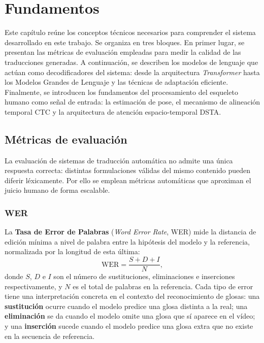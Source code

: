 \chapter{Fundamentos}\label{ch:fundamentos}
Este capítulo reúne los conceptos técnicos necesarios para comprender el sistema desarrollado en este trabajo.
Se organiza en tres bloques.
En primer lugar, se presentan las métricas de evaluación empleadas para medir la calidad de las traducciones generadas.
A continuación, se describen los modelos de lenguaje que actúan como decodificadores del sistema: desde la arquitectura \textit{Transformer} hasta los Modelos Grandes de Lenguaje y las técnicas de adaptación eficiente.
Finalmente, se introducen los fundamentos del procesamiento del esqueleto humano como señal de entrada: la estimación de pose, el mecanismo de alineación temporal CTC y la arquitectura de atención espacio-temporal DSTA.


\section{Métricas de evaluación}
La evaluación de sistemas de traducción automática no admite una única respuesta correcta: distintas formulaciones válidas del mismo contenido pueden diferir léxicamente.
Por ello se emplean métricas automáticas que aproximan el juicio humano de forma escalable.

\subsection{WER}\label{sec:WER}

La \textbf{Tasa de Error de Palabras} (\textit{Word Error Rate}, WER) mide la distancia de edición mínima a nivel de palabra entre la hipótesis del modelo y la referencia, normalizada por la longitud de esta última:
\begin{equation*}
  \mathrm{WER} = \frac{S + D + I}{N},
\end{equation*}
donde $S$, $D$ e $I$ son el número de sustituciones, eliminaciones e inserciones respectivamente, y $N$ es el total de palabras en la referencia.
Cada tipo de error tiene una interpretación concreta en el contexto del reconocimiento de glosas: una \textbf{sustitución} ocurre cuando el modelo predice una glosa distinta a la real; una \textbf{eliminación} se da cuando el modelo omite una glosa que sí aparece en el vídeo; y una \textbf{inserción} sucede cuando el modelo predice una glosa extra que no existe en la secuencia de referencia.

